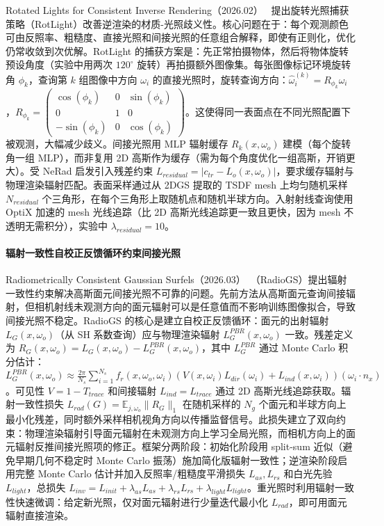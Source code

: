 Rotated Lights for Consistent Inverse Rendering（2026.02）~\cite{2602_08724} 提出旋转光照捕获策略（RotLight）改善逆渲染的材质-光照歧义性。核心问题在于：每个观测颜色可由反照率、粗糙度、直接光照和间接光照的任意组合解释，即使有正则化，优化仍常收敛到次优解。RotLight 的捕获方案是：先正常拍摄物体，然后将物体旋转预设角度（实验中用两次 $120^\circ$ 旋转）再拍摄额外图像集。每张图像标记环境旋转角 $\phi_k$，查询第 $k$ 组图像中方向 $\omega_i$ 的直接光照时，旋转查询方向：$\hat{\omega}_i^{(k)} = R_{\phi_k} \omega_i$，$R_{\phi_k} = \begin{pmatrix}\cos(\phi_k) & 0 & \sin(\phi_k)\\0&1&0\\-\sin(\phi_k)&0&\cos(\phi_k)\end{pmatrix}$。这使得同一表面点在不同光照配置下被观测，大幅减少歧义。间接光照用 MLP 辐射缓存 $R_k(x, \omega_o)$ 建模（每个旋转角一组 MLP），而非复用 2D 高斯作为缓存（需为每个角度优化一组高斯，开销更大）。受 NeRad 启发引入残差约束 $L_{residual} = |c_{tr} - L_o(x, \omega_o)|$，要求缓存辐射与物理渲染辐射匹配。表面采样通过从 2DGS 提取的 TSDF mesh 上均匀随机采样 $N_{residual}$ 个三角形，在每个三角形上取随机点和随机半球方向。入射射线查询使用 OptiX 加速的 mesh 光线追踪（比 2D 高斯光线追踪更一致且更快，因为 mesh 不透明无需积分），实验中 $\lambda_{residual}=10$。

\paragraph{辐射一致性自校正反馈循环约束间接光照}

Radiometrically Consistent Gaussian Surfels（2026.03）~\cite{2603_01491}（RadioGS）提出辐射一致性约束解决高斯面元间接光照不可靠的问题。先前方法从高斯面元查询间接辐射，但相机射线未观测方向的面元辐射可以是任意值而不影响训练图像拟合，导致间接光照不稳定。RadioGS 的核心是建立自校正反馈循环：面元的出射辐射 $L_G(x,\omega_o)$（从 SH 系数查询）应与物理渲染辐射 $L_G^{PBR}(x,\omega_o)$ 一致。残差定义为 $R_G(x,\omega_o) = L_G(x,\omega_o) - L_G^{PBR}(x,\omega_o)$，其中 $L_G^{PBR}$ 通过 Monte Carlo 积分估计：$L_G^{PBR}(x,\omega_o) \approx \frac{2\pi}{N_s}\sum_{i=1}^{N_s} f_r(x,\omega_o,\omega_i)(V(x,\omega_i)L_{dir}(\omega_i) + L_{ind}(x,\omega_i))(\omega_i \cdot n_x)$。可见性 $V=1-T_{trace}$ 和间接辐射 $L_{ind}=L_{trace}$ 通过 2D 高斯光线追踪获取。辐射一致性损失 $L_{rad}(G) = \mathbb{E}_{j,\omega_o}\|R_G\|_1$ 在随机采样的 $N_g$ 个面元和半球方向上最小化残差，同时额外采样相机视角方向以传播监督信号。此损失建立了双向约束：物理渲染辐射引导面元辐射在未观测方向上学习全局光照，而相机方向上的面元辐射反推间接光照项的修正。框架分两阶段：初始化阶段用 split-sum 近似（避免早期几何不稳定时 Monte Carlo 振荡）施加简化版辐射一致性；逆渲染阶段启用完整 Monte Carlo 估计并加入反照率/粗糙度平滑损失 $L_{as}, L_{rs}$ 和白光先验 $L_{light}$，总损失 $L_{inv} = L_{init} + \lambda_{as}L_{as} + \lambda_{rs}L_{rs} + \lambda_{light}L_{light}$。重光照时利用辐射一致性快速微调：给定新光照，仅对面元辐射进行少量迭代最小化 $L_{rad}$，即可用面元辐射直接渲染。

